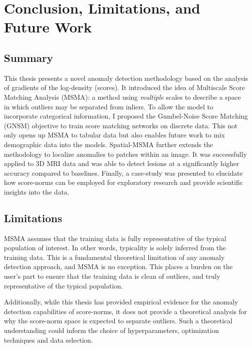 \chapter{Conclusion, Limitations, and Future Work}
\label{ch:conclusion}

\section{Summary}
This thesis presents a novel anomaly detection methodology based on the analysis of gradients of the log-density (scores). It introduced the idea of Multiscale Score Matching Analysis (MSMA): a method using \textit{multiple} scales to describe a space in which outliers may be separated from inliers.
To allow the model to incorporate categorical information, I proposed the Gumbel-Noise Score Matching (GNSM) objective to train score matching networks on discrete data. This not only opens up MSMA to tabular data but also enables future work to mix demographic data into the models.
Spatial-MSMA further extends the methodology to localize anomalies to patches within an image. It was successfully applied to 3D MRI data and was able to detect lesions at a significantly higher accuracy compared to baselines.
Finally, a case-study was presented to elucidate how score-norms can be employed for exploratory research and provide scientific insights into the data.

\section{Limitations}
MSMA assumes that the training data is fully representative of the typical population of interest. In other words, typicality is solely inferred from the training data. This is a fundamental theoretical limitation of any anomaly detection approach, and MSMA is no exception. This places a burden on the user's part to ensure that the training data is clean of outliers, and truly representative of the typical population.


Additionally, while this thesis has provided empirical evidence for the anomaly detection capabilities of score-norms, it does not provide a theoretical analysis for why the score-norm space is expected to separate outliers. Such a theoretical understanding could inform the choice of hyperparameters, optimization techniques and data selection.

